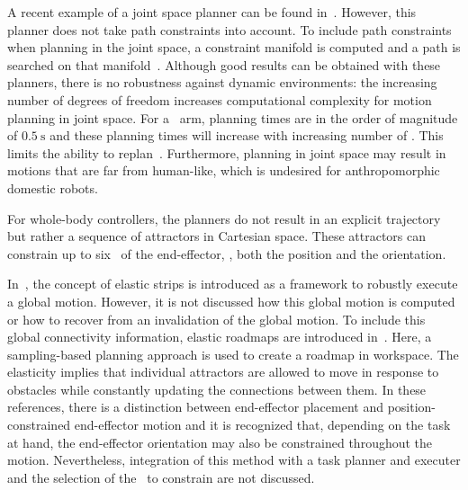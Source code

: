 A recent example of a joint space planner can be found in~\citet{Sucan2012}. However, this planner does not take path constraints into account. To include path constraints when planning in the joint space, a constraint manifold is computed and a path is searched on that manifold~\citep{Sucan2012a}. 
Although good results can be obtained with these planners, there is no robustness against dynamic environments: the increasing number of degrees of freedom increases computational complexity for motion planning in joint space. For a \ arm, planning times are in the order of magnitude of $0.5\ \mathrm{s}$ and these planning times will increase with increasing number of \dofs. This limits the ability to replan~\citep{Brock2002a}.
Furthermore, planning in joint space may result in motions that are far from human-like, which is undesired for anthropomorphic domestic robots.

For whole-body controllers, the planners do not result in an explicit trajectory but rather a sequence of attractors in Cartesian space. These attractors can constrain up to six \dofs\ of the end-effector, \ie, both the position and the orientation. 

In~\citet{Brock2002a}, the concept of elastic strips is introduced as a framework to robustly execute a global motion. However, it is not discussed how this global motion is computed or how to recover from an invalidation of the global motion. To include this global connectivity information, elastic roadmaps are introduced in~\citet{Yang2006,Yang2010}. Here, a sampling-based planning approach is used to create a roadmap in workspace. The elasticity implies that individual attractors are allowed to move in response to obstacles while constantly updating the connections between them. 
In these references, there is a distinction between end-effector placement and position-constrained end-effector motion and it is recognized that, depending on the task at hand, the end-effector orientation may also be constrained throughout the motion. 
Nevertheless, integration of this method with a task planner and executer and the selection of the \dofs\ to constrain are not discussed.

